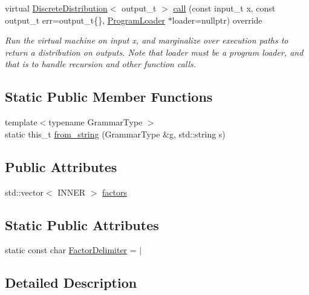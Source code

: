 \begin{DoxyCompactItemize}
virtual \hyperlink{class_discrete_distribution}{Discrete\+Distribution}$<$ output\+\_\+t $>$ \hyperlink{class_lexicon_a622f63b82d7056564f2c03ec4d599c91}{call} (const input\+\_\+t x, const output\+\_\+t err=output\+\_\+t\{\}, \hyperlink{class_program_loader}{Program\+Loader} $\ast$loader=nullptr) override
\begin{DoxyCompactList}\small\item\em Run the virtual machine on input x, and marginalize over execution paths to return a distribution on outputs. Note that loader must be a program loader, and that is to handle recursion and other function calls. \end{DoxyCompactList}\end{DoxyCompactItemize}
\subsection*{Static Public Member Functions}
\begin{DoxyCompactItemize}
\item 
{\footnotesize template$<$typename Grammar\+Type $>$ }\\static this\+\_\+t \hyperlink{class_lexicon_ae3ccf40adf7f3b6337bfe9728a551fc0}{from\+\_\+string} (Grammar\+Type \&g, std\+::string s)
\end{DoxyCompactItemize}
\subsection*{Public Attributes}
\begin{DoxyCompactItemize}
\item 
std\+::vector$<$ I\+N\+N\+ER $>$ \hyperlink{class_lexicon_ac502a88f9e4e38c18c74fa8d039cfe1e}{factors}
\end{DoxyCompactItemize}
\subsection*{Static Public Attributes}
\begin{DoxyCompactItemize}
\item 
static const char \hyperlink{class_lexicon_abf0f7108f95fdb5d3d66a9bc88a8d04d}{Factor\+Delimiter} = \textquotesingle{}$\vert$\textquotesingle{}
\end{DoxyCompactItemize}


\subsection{Detailed Description}
